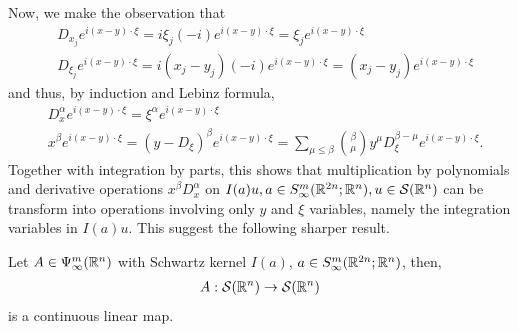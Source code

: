 \documentclass[12pt]{article}
\begin{document}
Now, we make the observation that
\begin{align*}
&D_{x_j} e^{i (x - y) \cdot \xi} = i \xi_{j} (-i) e^{i (x - y) \cdot \xi} = \xi_j e^{i (x - y) \cdot \xi}\\
& D_{\xi_j} e^{i (x - y) \cdot \xi} = i (x_j - y_j) (-i) e^{i (x - y) \cdot \xi} = (x_j - y_j) e^{i (x - y) \cdot \xi} 
\end{align*}
and thus, by induction and Lebinz formula, 
\begin{align} 
&D^\alpha_x e^{i (x - y) \cdot \xi} = \xi^\alpha e^{i (x - y) \cdot \xi} \label{eq : pre integration by parts 1} \\
& x^\beta e^{i (x - y) \cdot \xi} = (y - D_\xi)^\beta e^{i (x - y) \cdot \xi} = \sum_{\mu \leq \beta} \binom{\beta}{\mu} y^\mu D^{\beta - \mu}_\xi e^{i (x - y) \cdot \xi}. \label{eq : pre integration by parts 2}
\end{align}
Together with integration by parts, this shows that multiplication by polynomials and derivative operations $x^\beta D^\alpha_x$ on $I(a)u, a \in S^{m}_{\infty}({\mathbb R}^{2n}; {\mathbb R}^{n}), u \in \mathcal{S}({\mathbb R}^n)$ can be transform into operations involving only $y$ and $\xi$ variables, namely the integration variables in $I(a)u$. This suggest the following sharper result. 
\begin{fprop}\label{prop : schwartz to schwartz}
    Let $A \in \Psi^{m}_{\infty}({\mathbb R}^n)$ with Schwartz kernel $I(a)$, $a \in S^{m}_{\infty}({\mathbb R}^{2n}; {\mathbb R}^{n})$, then, 
    \begin{align*}
    A : \mathcal{S}({\mathbb R}^n) \to \mathcal{S}({\mathbb R}^n)
    \end{align*}
    is a continuous linear map. 
\end{fprop}
\end{document}
